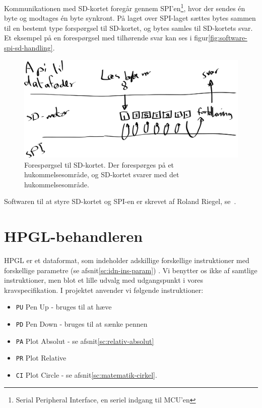 Kommunikationen med SD-kortet foregår gennem SPI'en\footnote{Serial
  Peripheral Interface, en seriel indgang til MCU'en}, hvor der sendes
én byte og modtages én byte synkront. På laget over SPI-laget sættes
bytes sammen til en bestemt type forspørgsel til SD-kortet, og bytes
samles til SD-kortets svar. Et eksempel på en forespørgsel med
tilhørende svar kan ses i figur\vref{fig:software-spi-sd-handling}.

\begin{figure}[htbp]
  \centering
  \includegraphics[width=\textwidth]{../brugere/kjaergaard/datafeeder-handling}
  \caption{Forespørgsel til SD-kortet. Der forespørges på et
    hukommelsesområde, og SD-kortet svarer med det hukommelsesområde.}
  \label{fig:software-spi-sd-handling}
\end{figure}


Softwaren til at styre SD-kortet og SPI-en er skrevet af Roland
Riegel, se~\cite{bbt:sd-software}.


\section{HPGL-behandleren}


HPGL er et dataformat, som indeholder adskillige forskellige
instruktioner med forskellige parametre (se
afsnit\vref{sc:idn-ins-param}) . Vi benytter os ikke af samtlige
instruktioner, men blot et lille udvalg med udgangspunkt i vores
kravspecifikation.  I projektet anvender vi følgende instruktioner:

\begin{itemize} \firmlist
\item \texttt{PU} Pen Up - bruges til at hæve
\item \texttt{PD} Pen Down - bruges til at sænke pennen
\item \texttt{PA} Plot Absolut - se afsnit\vref{sc:relativ-absolut}
\item \texttt{PR} Plot Relative
\item \texttt{CI}  Plot Circle - se afsnit\vref{sc:matematik-cirkel}.
\end{itemize}

